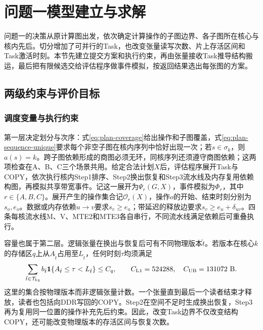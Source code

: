 \section{问题一模型建立与求解}
\label{sec:question-one}

问题一的决策从原计算图出发，依次确定计算操作的子图边界、各子图所在核心与核内先后。切分增加了可并行的Task，也改变张量读写次数、片上存活区间和Task激活时刻。本节先建立提交方案和执行约束，再由张量接收Task推导结构搬运，最后把有限候选交给评估程序做事件模拟，按返回结果选出每张图的方案。

\subsection{两级约束与评价目标}
\subsubsection{调度变量与执行约束}
第一层决定划分与次序：式\eqref{eq:plan-coverage}给出操作和子图覆盖，式\eqref{eq:plan-sequence-unique}要求每个非空子图在核内序列中恰好出现一次；若$s\in\sigma_k$，则$a(s)=k$。跨子图依赖形成的商图必须无环，同核序列还须遵守商图依赖；这两项检查在A、B、C三个场景共用。给定合法计划$X$后，评估程序展开Task与COPY，依次执行核内Step1排序、Step2换出恢复和Step3流水线及内存复用依赖构图，再模拟共享带宽事件。记这一展开为$\Psi_r(G,X)$，事件模拟为$\Phi_r$，其中$r\in\{A,B,C\}$。展开产生的操作集合记$\mathcal O_r(X)$，操作$o$的开始、结束时刻分别为$s_o,e_o$。数据或内存依赖$u\to v$要求$s_v\ge e_u$；带延迟的释放边要求$s_v\ge e_u+\delta_{uv}$。四条每核流水线M、V、MTE2和MTE3各自串行，不同流水线满足依赖后可重叠执行。

容量也属于第二层。逻辑张量在换出与恢复后可有不同物理版本$\tilde t$。若版本在核心$k$的存储区$q$上从$A_{\tilde t}$占用至$L_{\tilde t}$，任何时刻$\tau$均须满足
\begin{equation}
\sum_{\tilde t\in\mathcal T_{kq}} b_{\tilde t}
\mathbf1\{A_{\tilde t}\le\tau<L_{\tilde t}\}\le C_q,\qquad
C_{\rm L1}=524288,\quad C_{\rm UB}=131072\ \mathrm{B}.
\label{eq:capacity}
\end{equation}
这里的集合按物理版本而非逻辑张量计数。一个张量直到最后一个读者结束才释放，读者也包括向DDR写回的COPY。Step2在空间不足时生成换出恢复，Step3再为复用同一位置的操作补充先后约束。因此，改变Task边界不仅改变结构COPY，还可能改变物理版本的存活区间与恢复次数。

